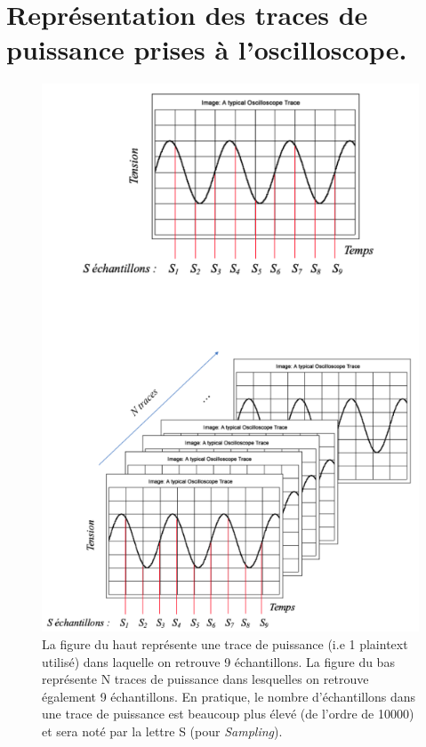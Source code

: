 \documentclass[10pt, oneside, a4paper]{article}
\begin{document}
\section{Représentation des traces de puissance prises à l'oscilloscope.}
\label{ann:traceExplain}
\begin{figure}[htbp]
    \centering
    \includegraphics[scale=0.65]{image/Sampling}
    \caption{La figure du haut représente une trace de puissance (i.e 1 plaintext utilisé) dans laquelle on retrouve 9 échantillons. La figure du bas représente N traces de puissance dans lesquelles on retrouve également 9 échantillons. En pratique, le nombre d'échantillons dans une trace de puissance est beaucoup plus élevé (de l'ordre de 10000) et sera noté par la lettre S (pour \textit{Sampling}).}
    \label{fig:traceExplain}
\end{figure}
\end{document}
